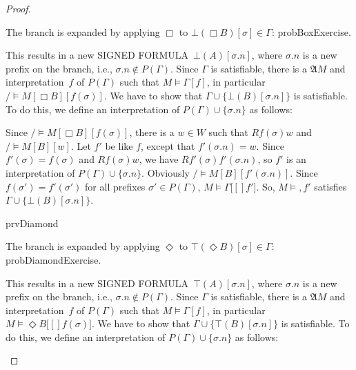 \documentclass[10pt,a4paper]{article}
\newcommand*{\olup}[1]{\MakeUppercase{#1}}
\theoremstyle{plain}
\theoremstyle{definition}
\theoremstyle{remark}
\providecommand{\sFmla}[2]{#1(#2)}
\providecommand{\True}{\top}
\providecommand{\False}{\bot}
\providecommand{\Struct}{\ensuremath{\mathfrak{A}}}
\providecommand{\Sat}[2]{\ensuremath{#1 \models #2}}
\providecommand{\mSat}[3]{\ensuremath{#1 \models #2[#3]}}
\providecommand{\mModel}[2]{\ensuremath{#1 \models #2}}
\providecommand{\iftag}[1]{#1}
\providecommand{\TRule}[1]{}
\providecommand{\iftag}{}
\begin{document}
\begin{proof}
\begin{enumerate}
{\item The branch is expanded by applying $\TRule{\False}{\Box}$ to
  $\sFmla{\False}{\Box B}[\sigma] \in \Gamma$:
  \iftag{probBox}{Exercise.}{This results in a new \olup{signed
      formula}~$\sFmla{\False}{A}[\sigma.n]$, where $\sigma.n$ is a
    new prefix on the branch, i.e., $\sigma.n \notin P(\Gamma)$.
    Since $\Gamma$ is satisfiable, there is a $\Struct{M}$ and
    interpretation~$f$ of $P(\Gamma)$ such that $\Sat{M}{\Gamma}[f]$,
    in particular $\mSat/{M}{\Box B}[f(\sigma)]$. We have to show
    that $\Gamma \cup \{\sFmla{\False}{B}[\sigma.n]\}$ is
    satisfiable. To do this, we define an interpretation of $P(\Gamma)
    \cup \{\sigma.n\}$ as follows:

  Since $\mSat/{M}{\Box B}[f(\sigma)]$, there is a $w \in W$ such that
  $Rf(\sigma)w$ and $\mSat/{M}{B}[w]$. Let $f'$ be like $f$, except
  that $f'(\sigma.n) = w$. Since $f'(\sigma) = f(\sigma)$ and
  $Rf(\sigma)w$, we have $Rf'(\sigma)f'(\sigma.n)$, so $f'$ is an
  interpretation of $P(\Gamma) \cup \{\sigma.n\}$.  Obviously
  $\mSat/{M}{B}[f'(\sigma.n)]$. Since $f(\sigma') = f'(\sigma')$ for
  all prefixes $\sigma' \in P(\Gamma)$, $\mSat{M}{\Gamma}[f']$.  So,
  $\mModel{M}, f'$ satisfies $\Gamma \cup
  \{\sFmla{\False}{B}[\sigma.n]\}$.}
  }{}

\iftag{prvDiamond}{%
\item The branch is expanded by applying $\TRule{\True}{\Diamond}$ to
  $\sFmla{\True}{\Diamond B}[\sigma] \in \Gamma$:
  \iftag{probDiamond}{Exercise.}{This results in a new \olup{signed
      formula}~$\sFmla{\True}{A}[\sigma.n]$, where $\sigma.n$ is a
    new prefix on the branch, i.e., $\sigma.n \notin P(\Gamma)$.
    Since $\Gamma$ is satisfiable, there is a $\Struct{M}$ and
    interpretation~$f$ of $P(\Gamma)$ such that $\Sat{M}{\Gamma}[f]$,
    in particular $\mSat{M}{\Diamond B}[f(\sigma)]$. We have to show
    that $\Gamma \cup \{\sFmla{\True}{B}[\sigma.n]\}$ is
    satisfiable. To do this, we define an interpretation of $P(\Gamma)
    \cup \{\sigma.n\}$ as follows:

}}
\end{enumerate}
\end{proof}
\end{document}
